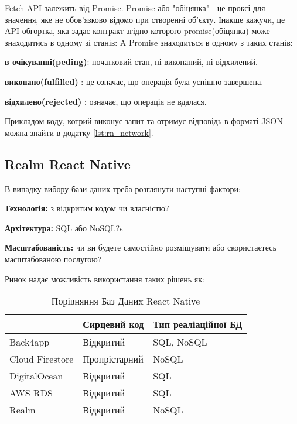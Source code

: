 Fetch API залежить від Promise.
Promise або "обіцянка" - це проксі для значення, яке не обов'язково відомо при створенні об'єкту.\cite{promise_doc}
Інакше кажучи, це API обгортка, яка задає контракт згідно которого promise(обіцянка) може знаходитись в одному зі станів:
A Promise знаходиться в одному з таких станів:
\begin{itemize}
    \begin{item}
        \textbf{в очікуванні(peding)}: початковий стан, ні виконаний, ні відхилений.
    \end{item}
    \begin{item}
        \textbf{виконано(fulfilled)} : це означає, що операція була успішно завершена.
    \end{item}
    \begin{item}
        \textbf{відхилено(rejected)} : означає, що операція не вдалася.
    \end{item}
\end{itemize}

Прикладом коду, котрий виконує запит та отримує відповідь в форматі JSON можна знайти в додатку \ref{lst:rn_network}.

\subsection{Realm React Native}
\label{subsec:rn_realm}
В випадку вибору бази даних треба розглянути наступні фактори:
\begin{itemize}
    \begin{item}
        \textbf{Технологія:} з відкритим кодом чи власністю?
    \end{item}
    \begin{item}
        \textbf{Архітектура:} SQL або NoSQL?s
    \end{item}
    \begin{item}
        \textbf{Масштабованість:} чи ви будете самостійно розміщувати або скористаєтесь масштабованою послугою?
    \end{item}
\end{itemize}

Ринок надає можливість використання таких рішень як:

\begin{longtable}[c]{|l|l|l|}
    \caption{Порівняння Баз Даниx React Native}
    \label{tab:rn_db_comparison} \\
    \hline
    & Сирцевий код  & Тип реаліаційної БД \\ \hline
    \endhead
%
    Back4app        & Відкритий     & SQL, NoSQL          \\ \hline
    Cloud Firestore & Пропрієтарний & NoSQL               \\ \hline
    DigitalOcean    & Відкритий     & SQL                 \\ \hline
    AWS RDS         & Відкритий     & SQL                 \\ \hline
    Realm           & Відкритий     & NoSQL               \\ \hline
\end{longtable}

